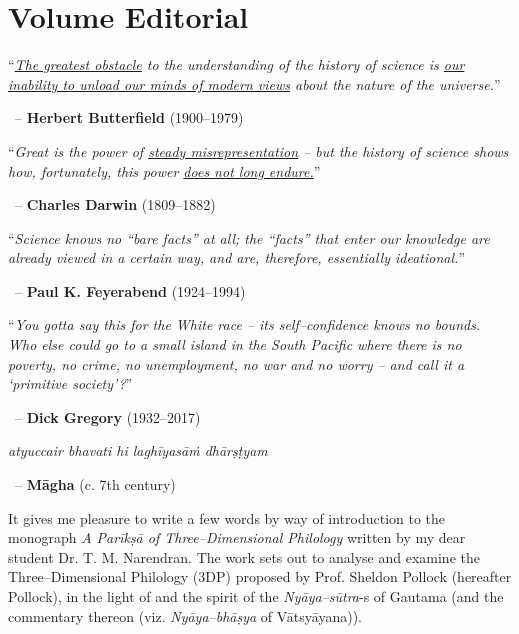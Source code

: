 
\chapter*{Volume Editorial}\label{volumeeditorial}

\begin{myquote}
“\textit{\underline{The greatest obstacle} to the understanding of the history of science is \underline{our inability to unload our minds of modern views} about the nature of the universe.}”
\end{myquote}


~\hfill – \textbf{Herbert Butterfield} (1900–1979)

\begin{myquote}
“\textit{Great is the power of \underline{steady misrepresentation} – but the history of science shows how, fortunately, this power \underline{does not long endure.}}”
\end{myquote}


~\hfill – \textbf{Charles Darwin} (1809–1882)

\begin{myquote}
“\textit{Science knows no “bare facts” at all; the “facts” that enter our knowledge are already viewed in a certain way, and are, therefore, essentially ideational.}”
\end{myquote}


~\hfill – \textbf{Paul K. Feyerabend }(1924–1994)

\begin{myquote}
“\textit{You gotta say this for the White race – its self–confidence knows no bounds. Who else could go to a small island in the South Pacific where there is no poverty, no crime, no unemployment, no war and no worry – and call it a ‘primitive society’?}”
\end{myquote}


~\hfill – \textbf{Dick Gregory }(1932–2017)

\begin{myquote}
\textit{atyuccair bhavati hi laghīyasāṁ dhārṣṭyam}
\end{myquote}


~\hfill – \textbf{Māgha} (c. 7th century)

It gives me pleasure to write a few words by way of introduction to the monograph \textit{A Parīkṣā of Three–Dimensional Philology} written by my dear student Dr. T. M. Narendran. The work sets out to analyse and examine the Three–Dimensional Philology (3DP) proposed by Prof. Sheldon Pollock (hereafter Pollock), in the light of and the spirit of the \textit{Nyāya–sūtra}-s of Gautama (and the commentary thereon (viz. \textit{Nyāya–bhāṣya} of Vātsyāyana)).

